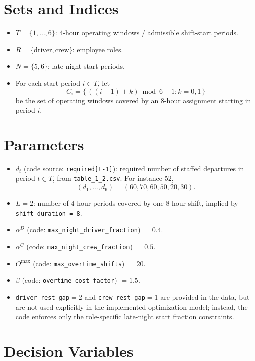 \section*{Sets and Indices}

\begin{itemize}
    \item $T=\{1,\dots,6\}$: 4-hour operating windows / admissible shift-start periods.
    \item $R=\{\mathrm{driver},\mathrm{crew}\}$: employee roles.
    \item $N=\{5,6\}$: late-night start periods.
    \item For each start period $i\in T$, let
    \[
    C_i=\{\,((i-1)+k)\bmod 6 +1 : k=0,1\,\}
    \]
    be the set of operating windows covered by an 8-hour assignment starting in period $i$.
\end{itemize}

\section*{Parameters}

\begin{itemize}
    \item $d_t$ (code source: \texttt{required[t-1]}): required number of staffed departures in period $t\in T$, from \texttt{table\_1\_2.csv}. For instance 52,
    \[
    (d_1,\dots,d_6)=(60,70,60,50,20,30).
    \]
    \item $L=2$: number of 4-hour periods covered by one 8-hour shift, implied by \texttt{shift\_duration = 8}.
    \item $\alpha^{D}$ (code: \texttt{max\_night\_driver\_fraction}) $=0.4$.
    \item $\alpha^{C}$ (code: \texttt{max\_night\_crew\_fraction}) $=0.5$.
    \item $O^{\max}$ (code: \texttt{max\_overtime\_shifts}) $=20$.
    \item $\beta$ (code: \texttt{overtime\_cost\_factor}) $=1.5$.
    \item \texttt{driver\_rest\_gap}$=2$ and \texttt{crew\_rest\_gap}$=1$ are provided in the data, but are not used explicitly in the implemented optimization model; instead, the code enforces only the role-specific late-night start fraction constraints.
\end{itemize}

\section*{Decision Variables}

